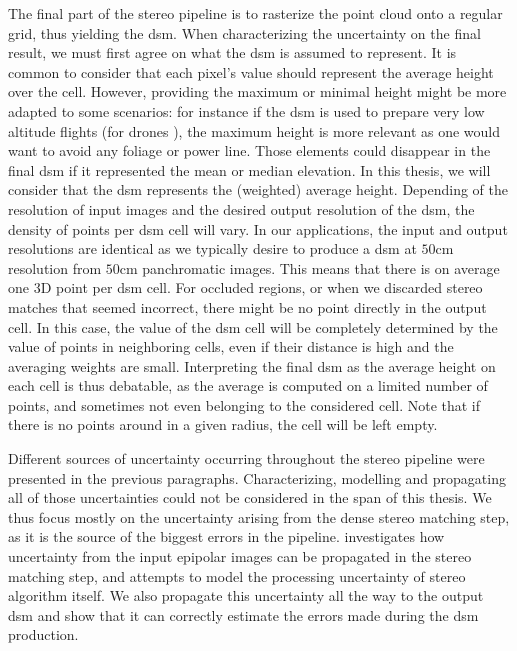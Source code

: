 The final part of the stereo pipeline is to rasterize the point cloud onto a regular grid, thus yielding the \acrshort{dsm}. When characterizing the uncertainty on the final result, we must first agree on what the \acrshort{dsm} is assumed to represent. It is common to consider that each pixel's value should represent the average height over the cell. However, providing the maximum or minimal height might be more adapted to some scenarios: for instance if the \acrshort{dsm} is used to prepare very low altitude flights (for drones \etc), the maximum height is more relevant as one would want to avoid any foliage or power line. Those elements could disappear in the final \acrshort{dsm} if it represented the mean or median elevation. In this thesis, we will consider that the \acrshort{dsm} represents the (weighted) average height. Depending of the resolution of input images and the desired output resolution of the \acrshort{dsm}, the density of points per \acrshort{dsm} cell will vary. In our applications, the input and output resolutions are identical as we typically desire to produce a \acrshort{dsm} at $50$cm resolution from $50$cm panchromatic images. This means that there is on average one 3D point per \acrshort{dsm} cell. For occluded regions, or when we discarded stereo matches that seemed incorrect, there might be no point directly in the output cell. In this case, the value of the \acrshort{dsm} cell will be completely determined by the value of points in neighboring cells, even if their distance is high and the averaging weights are small. Interpreting the final \acrshort{dsm} as the average height on each cell is thus debatable, as the average is computed on a limited number of points, and sometimes not even belonging to the considered cell. Note that if there is no points around in a given radius, the cell will be left empty. 

Different sources of uncertainty occurring throughout the stereo pipeline were presented in the previous paragraphs. Characterizing, modelling and propagating all of those uncertainties could not be considered in the span of this thesis. We thus focus mostly on the uncertainty arising from the dense stereo matching step, as it is the source of the biggest errors in the pipeline.  investigates how uncertainty from the input epipolar images can be propagated in the stereo matching step, and  attempts to model the processing uncertainty of stereo algorithm itself. We also propagate this uncertainty all the way to the output \acrshort{dsm} and show that it can correctly estimate the errors made during the \acrshort{dsm} production.

